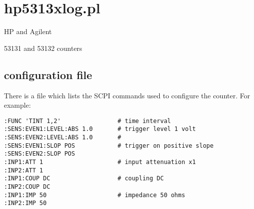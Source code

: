\section{hp5313xlog.pl}

\hypertarget{h:hp5313xlog}{HP and Agilent} 53131 and 53132 counters

\subsection{configuration file}

There is a file  which lists the SCPI commands used to configure the counter.
For example:
\begin{lstlisting}
:FUNC 'TINT 1,2'                # time interval
:SENS:EVEN1:LEVEL:ABS 1.0       # trigger level 1 volt
:SENS:EVEN2:LEVEL:ABS 1.0       #
:SENS:EVEN1:SLOP POS            # trigger on positive slope
:SENS:EVEN2:SLOP POS
:INP1:ATT 1                     # input attenuation x1
:INP2:ATT 1
:INP1:COUP DC                   # coupling DC
:INP2:COUP DC
:INP1:IMP 50                    # impedance 50 ohms
:INP2:IMP 50
\end{lstlisting}